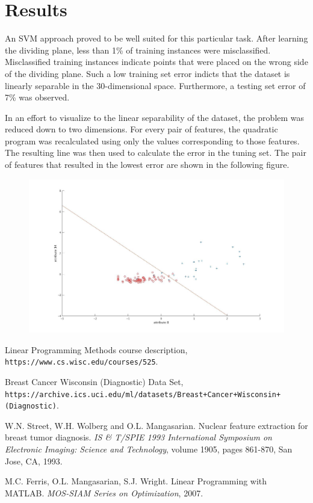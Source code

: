 \documentclass[10pt]{article}
\begin{document}
\section{Results}
An SVM approach proved to be well suited for this particular task. After learning the dividing plane, less than 1\% of training instances were misclassified. Misclassified training instances indicate points that were placed on the wrong side of the dividing plane. Such a low training set error indicts that the dataset is linearly separable in the 30-dimensional space. Furthermore, a testing set error of 7\% was observed. 



In an effort to visualize to the  linear separability of the dataset, the problem was reduced down to two dimensions.  For every pair of features, the quadratic program was recalculated using only the values corresponding to those features. The resulting line was then used to calculate the error in the tuning set. The pair of features that resulted in the lowest error are shown in the following figure.
\begin{figure}
	\includegraphics[width=\textwidth]{graph.jpg}
\end{figure}

\pagebreak
\begin{thebibliography}{9}
	Linear Programming Methods course description,
	\\\texttt{https://www.cs.wisc.edu/courses/525}.  
	
	Breast Cancer Wisconsin (Diagnostic) Data Set,
	\\\texttt{https://archive.ics.uci.edu/ml/datasets/Breast+Cancer+Wisconsin+(Diagnostic)}.
	
	W.N. Street, W.H. Wolberg and O.L. Mangasarian. Nuclear feature extraction for breast 
	tumor diagnosis. \textit{IS  \& T/SPIE 1993 International Symposium on Electronic 
	Imaging: Science and Technology}, volume 1905, pages 861-870, San Jose, CA, 1993. 
	
	M.C. Ferris, O.L. Mangasarian, S.J. Wright. Linear Programming with MATLAB. \textit{MOS-SIAM Series on Optimization}, 2007.
\end{thebibliography}
\end{document}
